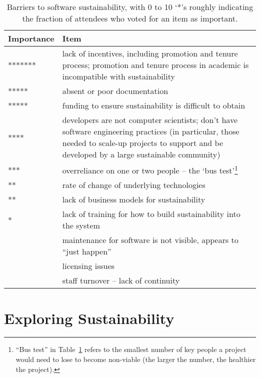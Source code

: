 \documentclass[11pt, oneside]{amsart}
\newcommand{\todo}[1]{{\color{blue}$\blacksquare$~\textsf{[TODO: #1]}}}
\begin{document}
\begin{table}[ht]
\caption{Barriers to software sustainability, with 0 to 10 `*'s roughly
indicating the fraction of attendees who voted for an item as important.}
\label{tb:software_sustainability_barriers}
 \centering
  \begin{small}
  \begin{tabular}{ | p{1.65cm} | p{12.0cm} |}
   \hline
  Importance & Item \\ \hline \hline
******* & lack of incentives, including promotion and tenure process; promotion
and tenure process in academic is incompatible with sustainability \\ \hline
*****  & absent or poor documentation \\ \hline
***** & funding to ensure sustainability is difficult to obtain \\ \hline
**** & developers are not computer scientists; don't have software engineering
practices (in particular, those needed to scale-up projects to support and be
developed by a large sustainable community) \\ \hline
*** & overreliance on one or two people -- the `bus test'\footnote{``Bus test''
in Table~\ref{tb:software_sustainability_barriers} refers to the smallest number
of key people a project would need to lose to become non-viable (the larger the
number, the healthier the project).} \\ \hline
** & rate of change of underlying technologies \\ \hline
** & lack of business models for sustainability \\ \hline
* & lack of training for how to build sustainability into the system \\ \hline
 & maintenance for software is not visible, appears to ``just happen'' \\ \hline
 & licensing issues \\ \hline
 & staff turnover -- lack of continuity \\ \hline
\end{tabular}
 \end{small}
\end{table}

\section{Exploring Sustainability} \label{sec:exploring}
\end{document}
